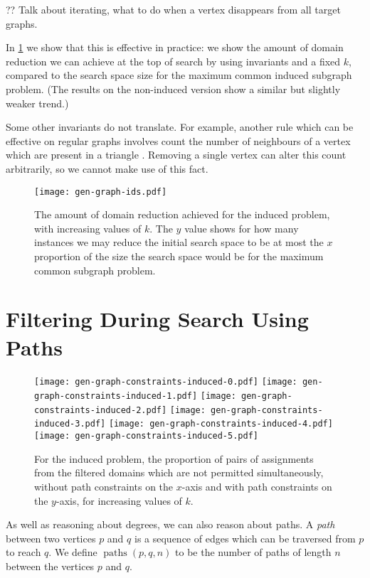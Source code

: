 \documentclass[letterpaper]{article}
\theoremstyle{definition}
\newcommand{\paths}{\operatorname{paths}}
\begin{document}
?? Talk about iterating, what to do when a vertex disappears from all target graphs.

In \cref{figure:ids} we show that this is effective in practice: we show the amount of domain reduction
we can achieve at the top of search by using invariants and a fixed $k$, compared to the search
space size for the maximum common induced subgraph problem. (The results on the non-induced version
show a similar but slightly weaker trend.)

Some other invariants do not translate. For example, another rule which can be effective on regular
graphs involves count the number of neighbours of a vertex which are present in a triangle
\cite{mckay2014practical}. Removing a single vertex can alter this count arbitrarily, so we cannot
make use of this fact.

\begin{figure}
    \centering
    \texttt{[image: gen-graph-ids.pdf]}
    \caption{The amount of domain reduction achieved for the induced problem, with increasing values
    of $k$. The $y$ value shows for how many instances we may reduce the initial search space to be
    at most the $x$ proportion of the size the search space would be for the maximum common subgraph
    problem.}\label{figure:ids}
\end{figure}

\section{Filtering During Search Using Paths}\label{section:pathfiltering}

\begin{figure*}[tb]
    \centering
    \texttt{[image: gen-graph-constraints-induced-0.pdf]}
    \texttt{[image: gen-graph-constraints-induced-1.pdf]}
    \texttt{[image: gen-graph-constraints-induced-2.pdf]}
    \texttt{[image: gen-graph-constraints-induced-3.pdf]}
    \texttt{[image: gen-graph-constraints-induced-4.pdf]}
    \texttt{[image: gen-graph-constraints-induced-5.pdf]}

    \caption{For the induced problem, the proportion of pairs of assignments from the filtered
    domains which are not permitted simultaneously, without path constraints on the $x$-axis and
    with path constraints on the $y$-axis, for increasing values of $k$.}\label{figure:constraints}
\end{figure*}

As well as reasoning about degrees, we can also reason about paths.  A \emph{path} between two
vertices $p$ and $q$ is a sequence of edges which can be traversed from $p$ to reach $q$. We define
$\paths(p,q,n)$ to be the number of paths of length $n$ between the vertices $p$ and $q$.
\end{document}
